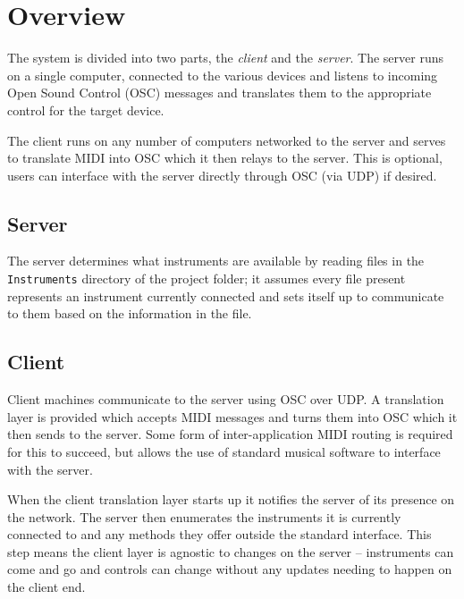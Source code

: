 \documentclass[11pt]{article}
\begin{document}
\section{Overview}
The system is divided into two parts, the {\em client} and the {\em server}. The server runs on a single computer, connected to the various devices and listens to incoming Open Sound 
Control (OSC) messages and translates them to the appropriate control for the target device. 

The client runs on any number of computers networked to the server and serves to translate MIDI into OSC which it then relays to the server. This is optional, users
can interface with the server directly through OSC (via UDP) if desired.

\subsection{Server}
The server determines what instruments are available by reading files in the \texttt{Instruments} directory of the project folder; it assumes every file present represents an instrument
currently connected and sets itself up to communicate to them based on the information in the file.

\subsection{Client}
Client machines communicate to the server using OSC over UDP. A translation layer is provided which accepts MIDI messages and turns them into OSC which it then sends to the 
server. Some form of inter-application MIDI routing is required for this to succeed, but allows the use of standard musical software to interface with the server. 

When the client translation layer starts up it notifies the server of its presence on the network. The server then enumerates the instruments it is currently connected to and any methods
they offer outside the standard interface. This step means the client layer is agnostic to changes on the server -- instruments can come and go and controls can change without any
updates needing to happen on the client end.
\end{document}
